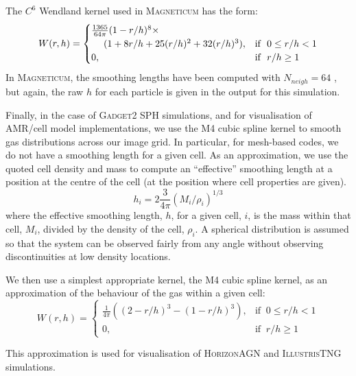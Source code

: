 \documentclass[
  journal=pasa,
  manuscript=research-paper, %
  year=2020,
  volume=37,
]{cup-journal}
\newcommand{\magneticum}[1]{\textsc{Magneticum}#1} %
\newcommand{\illustristng}[1]{\textsc{IllustrisTNG}#1} %
\newcommand{\horizon}[1]{\textsc{HorizonAGN}#1} %
\newcommand{\gadget}[1]{\textsc{Gadget2}#1} %
\begin{document}
The $C^{6}$ Wendland kernel used in \magneticum{} \citep{Teklu2015ConnectingMorphology} has the form:
\begin{equation}
    W(r,h) =
    \begin{cases}
        \frac{1365}{64 \pi}(1 - r/h)^8 \times \\ \hspace{3ex} (1 + 8 r/h  + 25 (r/h)^2 + 32 (r/h)^3),& \text{if }\ 0 \leq r/h < 1\\
        0,                                     & \text{if }\ r/h \geq 1
    \end{cases}
\end{equation}
In \magneticum{,} the smoothing lengths have been computed with $N_{neigh}=64$ \citep{Beck2016Ansimulations}, but again, the raw $h$ for each particle is given in the output for this simulation. 

Finally, in the case of \gadget{} SPH simulations, and for visualisation of AMR/cell model implementations, we use the M4 cubic spline kernel to smooth gas distributions across our image grid.
In particular, for mesh-based codes, we do not have a smoothing length for a given cell. 
As an approximation, we use the quoted cell density and mass to compute an ``effective'' smoothing length at a position at the centre of the cell (at the position where cell properties are given).
\begin{equation}
    h_i = 2 \frac{3}{4 \pi} \left( M_i / \rho_i\right)^{1/3}
\end{equation}
where the effective smoothing length, $h$, for a given cell, $i$, is the mass within that cell, $M_i$, divided by the density of the cell, $\rho_i$. 
A spherical distribution is assumed so that the system can be observed fairly from any angle without observing discontinuities at low density locations.  

We then use a simplest appropriate kernel, the M4 cubic spline kernel, as an approximation of the behaviour of the gas within a given cell:
\begin{equation}
    W(r,h) =
    \begin{cases}
        \frac{1}{4 \pi} \left((2 - r/h)^3 - (1 - r/h)^3\right) ,& \text{if }\ 0 \leq r/h < 1\\
        0,                                     & \text{if }\ r/h \geq 1
    \end{cases}
\end{equation}

This approximation is used for visualisation of \horizon{} and \illustristng{} simulations. 
\end{document}
